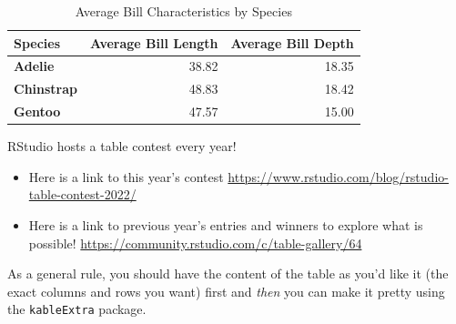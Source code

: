 \documentclass[
  letterpaper,
  DIV=11,
  numbers=noendperiod]{scrartcl}
\providecommand{\tightlist}{%
  \setlength{\itemsep}{0pt}\setlength{\parskip}{0pt}}\usepackage{longtable,booktabs,array}
\begin{document}
\begin{table}
\centering
\caption{Average Bill Characteristics by Species}
\centering
\begin{tabular}[t]{>{}l|r|r}
\hline
Species & Average Bill Length & Average Bill Depth\\
\hline
\textcolor[HTML]{ff7501}{\textbf{Adelie}} & \textcolor[HTML]{ff7501}{38.82} & \textcolor[HTML]{ff7501}{18.35}\\
\hline
\textcolor[HTML]{c85bcc}{\textbf{Chinstrap}} & \textcolor[HTML]{c85bcc}{48.83} & \textcolor[HTML]{c85bcc}{18.42}\\
\hline
\textcolor[HTML]{067176}{\textbf{Gentoo}} & \textcolor[HTML]{067176}{47.57} & \textcolor[HTML]{067176}{15.00}\\
\hline
\end{tabular}
\end{table}

RStudio hosts a table contest every year!

\begin{itemize}
\tightlist
\item
  Here is a link to this year's contest
  \url{https://www.rstudio.com/blog/rstudio-table-contest-2022/}
\item
  Here is a link to previous year's entries and winners to explore what
  is possible! \url{https://community.rstudio.com/c/table-gallery/64}
\end{itemize}

\begin{tcolorbox}[enhanced jigsaw, bottomrule=.15mm, rightrule=.15mm, colbacktitle=quarto-callout-tip-color!10!white, bottomtitle=1mm, left=2mm, toptitle=1mm, title=\textcolor{quarto-callout-tip-color}{\faLightbulb}\hspace{0.5em}{Tip}, toprule=.15mm, titlerule=0mm, breakable, arc=.35mm, colback=white, coltitle=black, opacitybacktitle=0.6, leftrule=.75mm, opacityback=0, colframe=quarto-callout-tip-color-frame]

As a general rule, you should have the content of the table as you'd
like it (the exact columns and rows you want) first and \emph{then} you
can make it pretty using the \texttt{kableExtra} package.

\end{tcolorbox}
\end{document}
